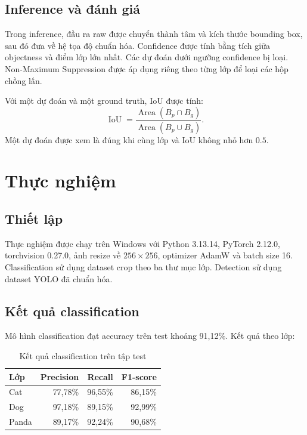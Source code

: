 \documentclass[12pt,a4paper]{article}
\newcommand{\classaccuracy}{91,12\%}
\begin{document}
\subsection{Inference và đánh giá}

Trong inference, đầu ra raw được chuyển thành tâm và kích thước bounding box, sau đó đưa về hệ tọa độ chuẩn hóa. Confidence được tính bằng tích giữa objectness và điểm lớp lớn nhất. Các dự đoán dưới ngưỡng confidence bị loại. Non-Maximum Suppression được áp dụng riêng theo từng lớp để loại các hộp chồng lấn.

Với một dự đoán và một ground truth, IoU được tính:
\[
\operatorname{IoU}=\frac{\operatorname{Area}(B_p\cap B_g)}
{\operatorname{Area}(B_p\cup B_g)}.
\]
Một dự đoán được xem là đúng khi cùng lớp và IoU không nhỏ hơn $0.5$.

\section{Thực nghiệm}

\subsection{Thiết lập}

Thực nghiệm được chạy trên Windows với Python 3.13.14, PyTorch 2.12.0, torchvision 0.27.0, ảnh resize về $256\times256$, optimizer AdamW và batch size 16. Classification sử dụng dataset crop theo ba thư mục lớp. Detection sử dụng dataset YOLO đã chuẩn hóa.

\subsection{Kết quả classification}

Mô hình classification đạt accuracy trên test khoảng \classaccuracy. Kết quả theo lớp:

\begin{table}[H]
\centering
\caption{Kết quả classification trên tập test}
\begin{tabular}{lrrr}
\toprule
\textbf{Lớp} & \textbf{Precision} & \textbf{Recall} & \textbf{F1-score}\\
\midrule
Cat & 77,78\% & 96,55\% & 86,15\%\\
Dog & 97,18\% & 89,15\% & 92,99\%\\
Panda & 89,17\% & 92,24\% & 90,68\%\\
\bottomrule
\end{tabular}
\end{table}
\end{document}
